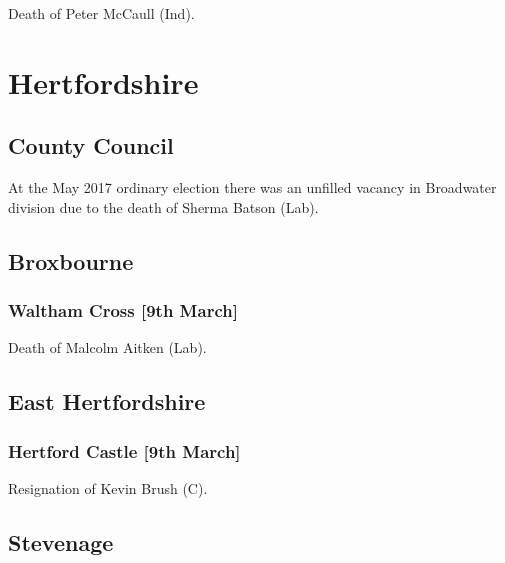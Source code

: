 \documentclass[a4paper,openany]{book}
\begin{document}
\begin{resultsiii}
Death of Peter McCaull (Ind).

\section{Hertfordshire}

\subsection*{County Council}

At the May 2017 ordinary election there was an unfilled vacancy in Broadwater division due to the death of Sherma Batson (Lab).

\subsection*{Broxbourne}

\subsubsection*{Waltham Cross \hspace*{\fill}\nolinebreak[1]%
\enspace\hspace*{\fill}
[9th March]}


Death of Malcolm Aitken (Lab).

\subsection*{East Hertfordshire}

\subsubsection*{Hertford Castle \hspace*{\fill}\nolinebreak[1]%
\enspace\hspace*{\fill}
[9th March]}


Resignation of Kevin Brush (C).

\subsection*{Stevenage}


\end{resultsiii}
\end{document}

